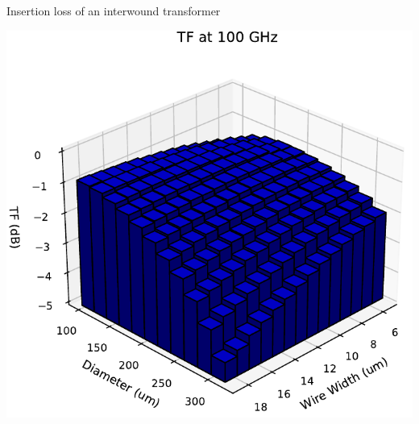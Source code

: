 \documentclass{sdkslides}
\begin{document}
\begin{frame}[c]
\begin{minipage}[t]{0.48\textwidth}
\begin{block}{Insertion loss of an interwound transformer}
\begin{center}
                \includegraphics[width=\textwidth]{./Pics/diff_S21_int_TF_3Dbar_diam_width_sweep_4.pdf}
            \end{center}
        \end{block}
    \end{minipage}
\end{frame}
\end{document}
